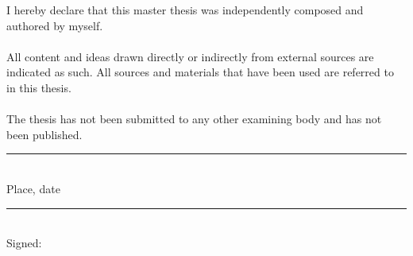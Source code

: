 

\begin{declaration}
\addchaptertocentry{\authorshipname} %

\noindent I hereby declare that this master thesis was independently composed and authored by myself. \\ \\


\noindent All content and ideas drawn directly or indirectly from external sources are indicated as such. All sources and materials that have been used are referred to in this thesis. \\ \\


\noindent The thesis has not been submitted to any other examining body and has not been published.

\vspace{1.5cm}  

\noindent \rule[0.5em]{25em}{0.5pt} \\ %
\noindent Place, date  
 
 
\vspace{1.5cm} 
 

\noindent \rule[0.5em]{25em}{0.5pt} \\ %
\noindent Signed: \authorname
 

\end{declaration}